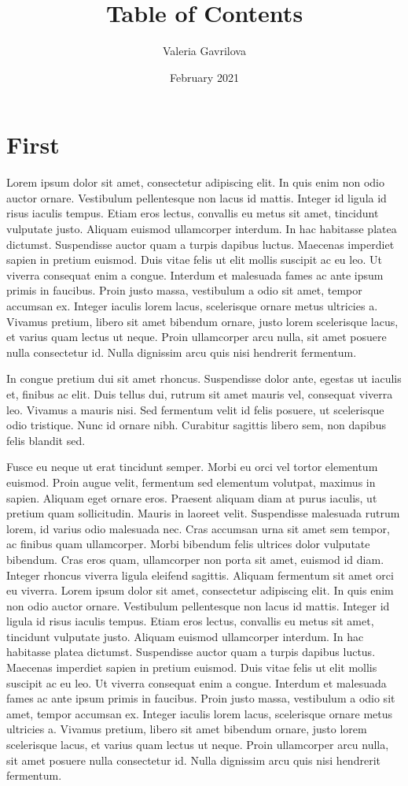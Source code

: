 \documentclass{scrartcl}
\title{Table of Contents}
\author{Valeria Gavrilova}
\date{February 2021}
\begin{document}
\tableofcontents 
\section{First}
Lorem ipsum dolor sit amet, consectetur adipiscing elit. In quis enim non odio auctor ornare. Vestibulum pellentesque non lacus id mattis. Integer id ligula id risus iaculis tempus. Etiam eros lectus, convallis eu metus sit amet, tincidunt vulputate justo. Aliquam euismod ullamcorper interdum. In hac habitasse platea dictumst. Suspendisse auctor quam a turpis dapibus luctus. Maecenas imperdiet sapien in pretium euismod. Duis vitae felis ut elit mollis suscipit ac eu leo. Ut viverra consequat enim a congue. Interdum et malesuada fames ac ante ipsum primis in faucibus. Proin justo massa, vestibulum a odio sit amet, tempor accumsan ex. Integer iaculis lorem lacus, scelerisque ornare metus ultricies a. Vivamus pretium, libero sit amet bibendum ornare, justo lorem scelerisque lacus, et varius quam lectus ut neque. Proin ullamcorper arcu nulla, sit amet posuere nulla consectetur id. Nulla dignissim arcu quis nisi hendrerit fermentum.

In congue pretium dui sit amet rhoncus. Suspendisse dolor ante, egestas ut iaculis et, finibus ac elit. Duis tellus dui, rutrum sit amet mauris vel, consequat viverra leo. Vivamus a mauris nisi. Sed fermentum velit id felis posuere, ut scelerisque odio tristique. Nunc id ornare nibh. Curabitur sagittis libero sem, non dapibus felis blandit sed.

Fusce eu neque ut erat tincidunt semper. Morbi eu orci vel tortor elementum euismod. Proin augue velit, fermentum sed elementum volutpat, maximus in sapien. Aliquam eget ornare eros. Praesent aliquam diam at purus iaculis, ut pretium quam sollicitudin. Mauris in laoreet velit. Suspendisse malesuada rutrum lorem, id varius odio malesuada nec. Cras accumsan urna sit amet sem tempor, ac finibus quam ullamcorper. Morbi bibendum felis ultrices dolor vulputate bibendum. Cras eros quam, ullamcorper non porta sit amet, euismod id diam. Integer rhoncus viverra ligula eleifend sagittis. Aliquam fermentum sit amet orci eu viverra.
Lorem ipsum dolor sit amet, consectetur adipiscing elit. In quis enim non odio auctor ornare. Vestibulum pellentesque non lacus id mattis. Integer id ligula id risus iaculis tempus. Etiam eros lectus, convallis eu metus sit amet, tincidunt vulputate justo. Aliquam euismod ullamcorper interdum. In hac habitasse platea dictumst. Suspendisse auctor quam a turpis dapibus luctus. Maecenas imperdiet sapien in pretium euismod. Duis vitae felis ut elit mollis suscipit ac eu leo. Ut viverra consequat enim a congue. Interdum et malesuada fames ac ante ipsum primis in faucibus. Proin justo massa, vestibulum a odio sit amet, tempor accumsan ex. Integer iaculis lorem lacus, scelerisque ornare metus ultricies a. Vivamus pretium, libero sit amet bibendum ornare, justo lorem scelerisque lacus, et varius quam lectus ut neque. Proin ullamcorper arcu nulla, sit amet posuere nulla consectetur id. Nulla dignissim arcu quis nisi hendrerit fermentum.
\end{document}
